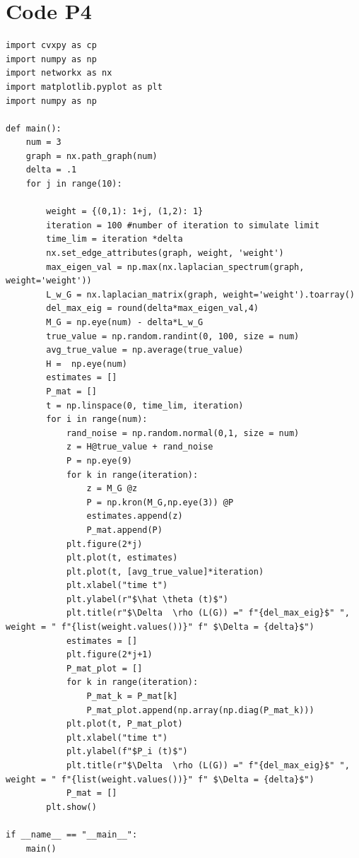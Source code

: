 \documentclass{article}
\begin{document}
\section*{Code P4}
\begin{verbatim}
import cvxpy as cp
import numpy as np
import networkx as nx
import matplotlib.pyplot as plt
import numpy as np

def main():
    num = 3
    graph = nx.path_graph(num)
    delta = .1
    for j in range(10):

        weight = {(0,1): 1+j, (1,2): 1}
        iteration = 100 #number of iteration to simulate limit
        time_lim = iteration *delta
        nx.set_edge_attributes(graph, weight, 'weight')
        max_eigen_val = np.max(nx.laplacian_spectrum(graph, weight='weight'))
        L_w_G = nx.laplacian_matrix(graph, weight='weight').toarray()
        del_max_eig = round(delta*max_eigen_val,4)
        M_G = np.eye(num) - delta*L_w_G
        true_value = np.random.randint(0, 100, size = num)
        avg_true_value = np.average(true_value)
        H =  np.eye(num)
        estimates = []
        P_mat = []
        t = np.linspace(0, time_lim, iteration)
        for i in range(num):
            rand_noise = np.random.normal(0,1, size = num)
            z = H@true_value + rand_noise
            P = np.eye(9)
            for k in range(iteration):
                z = M_G @z
                P = np.kron(M_G,np.eye(3)) @P
                estimates.append(z)
                P_mat.append(P)
            plt.figure(2*j)
            plt.plot(t, estimates)
            plt.plot(t, [avg_true_value]*iteration)
            plt.xlabel("time t")
            plt.ylabel(r"$\hat \theta (t)$")
            plt.title(r"$\Delta  \rho (L(G)) =" f"{del_max_eig}$" ", weight = " f"{list(weight.values())}" f" $\Delta = {delta}$")
            estimates = []
            plt.figure(2*j+1)
            P_mat_plot = []
            for k in range(iteration):
                P_mat_k = P_mat[k]
                P_mat_plot.append(np.array(np.diag(P_mat_k)))
            plt.plot(t, P_mat_plot)
            plt.xlabel("time t")
            plt.ylabel(f"$P_i (t)$")
            plt.title(r"$\Delta  \rho (L(G)) =" f"{del_max_eig}$" ", weight = " f"{list(weight.values())}" f" $\Delta = {delta}$")
            P_mat = []
        plt.show()

if __name__ == "__main__":
    main()

    
\end{verbatim}
\end{document}
